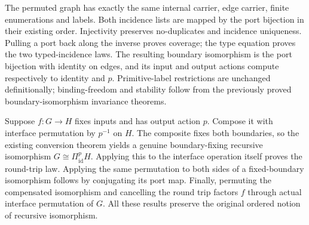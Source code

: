 



The permuted graph has exactly the same internal carrier, edge carrier,
finite enumerations and labels. Both incidence lists are mapped by the port
bijection in their existing order. Injectivity preserves no-duplicates and
incidence uniqueness. Pulling a port back along the inverse proves coverage;
the type equation proves the two typed-incidence laws. The resulting boundary
isomorphism is the port bijection with identity on edges, and its input and output
actions compute respectively to identity and $p$. Primitive-label restrictions
are unchanged definitionally; binding-freedom and stability follow from the
previously proved boundary-isomorphism invariance theorems.








Suppose $f:G\to H$ fixes inputs and has output action $p$. Compose it with
interface permutation by $p^{-1}$ on $H$. The composite fixes both boundaries,
so the existing conversion theorem yields a genuine boundary-fixing recursive
isomorphism $G\cong \Pi^p_{\mathrm{id}}H$. Applying this to the interface
operation itself proves the round-trip law. Applying the same permutation to
both sides of a fixed-boundary isomorphism follows by conjugating its port map.
Finally, permuting the compensated isomorphism and cancelling the round trip
factors $f$ through actual interface permutation of $G$. All these results preserve
the original ordered notion of recursive isomorphism.


